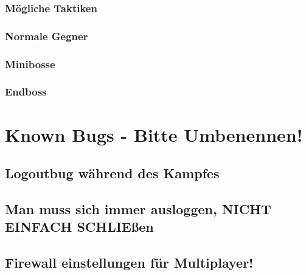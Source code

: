 \documentclass[fontsize=12pt,paper=a4,twoside]{scrartcl}
\begin{document}
\subsubsection{Mögliche Taktiken}

\subsubsection{Normale Gegner}

\subsubsection{Minibosse}

\subsubsection{Endboss}


\section{Known Bugs - Bitte Umbenennen!}

\subsection{Logoutbug während des Kampfes}

\subsection{Man muss sich immer ausloggen, NICHT EINFACH SCHLIEßen}

\subsection{Firewall einstellungen für Multiplayer!}
\end{document}
